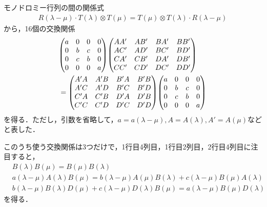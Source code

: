 \documentclass[\main/main.tex]{subfiles}
\begin{document}
\begin{frame}{}
    モノドロミー行列の間の関係式
    \begin{align}
        R(\lambda - \mu) \cdot T(\lambda)\otimes T(\mu)
        = T(\mu) \otimes T(\lambda) \cdot R(\lambda-\mu)
    \end{align}
    から，16個の交換関係
    \begin{align}
        &\nonumber
         \mqty(
            a&0&0&0\\
            0&b&c&0\\
            0&c&b&0\\
            0&0&0&a
        ) \mqty
        (
            AA'&AB'&BA'&BB'\\
            AC'&AD'&BC'&BD'\\
            CA'&CB'&DA'&DB'\\
            CC'&CD'&DC'&DD'
        )
        \\ &
        = \mqty
        (
            A'A&A'B&B'A&B'B\\
            A'C&A'D&B'C&B'D\\
            C'A&C'B&D'A&D'B\\
            C'C&C'D&D'C&D'D
        ) \mqty(
            a&0&0&0\\
            0&b&c&0\\
            0&c&b&0\\
            0&0&0&a
        )
    \end{align}
    を得る．ただし，引数を省略して，$a = a(\lambda-\mu), A = A(\lambda), A' = A(\mu)$などと表した．
\end{frame}

\begin{frame}{}
    このうち使う交換関係は3つだけで，1行目4列目，1行目2列目，2行目4列目に注目すると，
    \begin{align}
        &
        B(\lambda) B(\mu) = B(\mu) B(\lambda)
        \\ &
        a(\lambda-\mu) A(\lambda)B(\mu) = b(\lambda-\mu) A(\mu)B(\lambda) + c(\lambda-\mu) B(\mu)A(\lambda)
        \\ &
        b(\lambda-\mu) B(\lambda)D(\mu) + c(\lambda-\mu) D(\lambda) B(\mu) = a(\lambda-\mu)B(\mu)D(\lambda)
    \end{align}
    を得る．
\end{frame}
\end{document}
